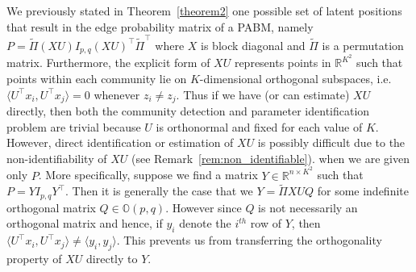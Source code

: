 \documentclass[12pt]{article}
\begin{document}
We previously stated in Theorem~\ref{theorem2} one possible set of latent positions that result in
the edge probability matrix of a PABM, namely
\(P = \tilde{\Pi} (XU) I_{p, q}
(XU)^\top \tilde{\Pi}^{\top}\) where $X$ is block diagonal and
$\tilde{\Pi}$ is a permutation matrix.  
Furthermore, the explicit form of \(XU\) represents points in \(\mathbb{R}^{K^2}\)
such that points within each community lie on \(K\)-dimensional
orthogonal subspaces, i.e. $\langle U^{\top} x_i, U^{\top} x_j \rangle = 0$ whenever $z_i \not = z_j$. 
Thus if
we have (or can estimate) \(XU\) directly, then both the community
detection and parameter identification problem are trivial because \(U\)
is orthonormal and fixed for each value of \(K\). 
However, direct
identification or estimation of \(XU\) is possibly difficult 
due to the non-identifiability of $XU$ (see Remark~\ref{rem:non_identifiable}).
when we are given only $P$. %
More specifically, suppose we find a matrix $Y \in
\mathbb{R}^{n \times K^2}$
such that \(P = Y I_{p, q} Y^\top\). Then it is generally the case that
we  \( Y = \tilde{\Pi} XU Q \) for some indefinite orthogonal matrix
$Q \in \mathbb{O}(p,q)$. %
However since \(Q\) is not necessarily an
orthogonal matrix and hence, if $y_i$ denote the $i^{th}$ row of $Y$, 
then $\langle U^{\top} x_i, U^{\top} x_j \rangle
\neq \langle y_i, y_j \rangle$.
This prevents us from transferring the orthogonality property of
\(XU\) directly to $Y$. 
\end{document}
